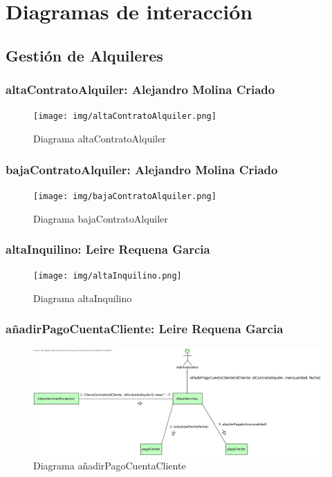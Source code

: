 \chapter{Diagramas de interacción}

\section{Gestión de Alquileres}
\subsection{altaContratoAlquiler: Alejandro Molina Criado}
\begin{figure}[!h]
  \centering
    \texttt{[image: img/altaContratoAlquiler.png]}
    \caption{Diagrama altaContratoAlquiler}
\end{figure}

\pagebreak
\subsection{bajaContratoAlquiler: Alejandro Molina Criado}
\begin{figure}[!h]
  \centering
    \texttt{[image: img/bajaContratoAlquiler.png]}
    \caption{Diagrama bajaContratoAlquiler}
\end{figure}

\subsection{altaInquilino: Leire Requena Garcia}
\begin{figure}[!h]
  \centering
    \texttt{[image: img/altaInquilino.png]}
    \caption{Diagrama altaInquilino}
\end{figure}

\pagebreak
\subsection{añadirPagoCuentaCliente: Leire Requena Garcia}
\begin{figure}[!h]
  \centering
    \includegraphics[scale=0.7]{img/añadirPagoCuentaCliente.png}
    \caption{Diagrama añadirPagoCuentaCliente}
\end{figure}

